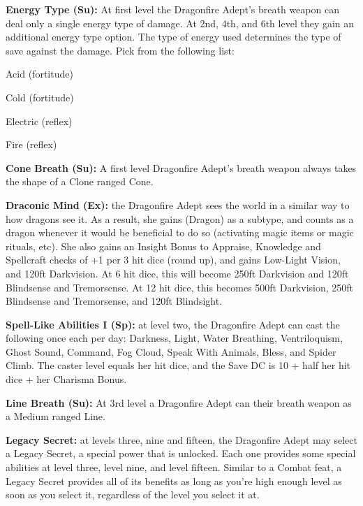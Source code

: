 \textbf{Energy Type (Su):} At first level the Dragonfire Adept's breath weapon can deal only a single energy type of damage. At 2nd, 4th, and 6th level they gain an additional energy type option. The type of energy used determines the type of save against the damage. Pick from the following list:
\begin{itemize*}
\item Acid (fortitude)
\item Cold (fortitude)
\item Electric (reflex)
\item Fire (reflex)
\end{itemize*}

\textbf{Cone Breath (Su):} A first level Dragonfire Adept's breath weapon always takes the shape of a Clone ranged Cone.

\textbf{Draconic Mind (Ex):} the Dragonfire Adept sees the world in a similar way to how dragons see it. As a result, she gains (Dragon) as a subtype, and counts as a dragon whenever it would be beneficial to do so (activating magic items or magic rituals, etc). She also gains an Insight Bonus to Appraise, Knowledge and Spellcraft checks of +1 per 3 hit dice (round up), and gains Low-Light Vision, and 120ft Darkvision. At 6 hit dice, this will become 250ft Darkvision and 120ft Blindsense and Tremorsense. At 12 hit dice, this becomes 500ft Darkvision, 250ft Blindsense and Tremorsense, and 120ft Blindsight.

\textbf{Spell-Like Abilities I (Sp):} at level two, the Dragonfire Adept can cast the following once each per day: Darkness, Light, Water Breathing, Ventriloquism, Ghost Sound, Command, Fog Cloud, Speak With Animals, Bless, and Spider Climb. The caster level equals her hit dice, and the Save DC is 10 + half her hit dice + her Charisma Bonus.

\textbf{Line Breath (Su):} At 3rd level a Dragonfire Adept can their breath weapon as a Medium ranged Line.

\textbf{Legacy Secret:} at levels three, nine and fifteen, the Dragonfire Adept may select a Legacy Secret, a special power that is unlocked. Each one provides some special abilities at level three, level nine, and level fifteen. Similar to a Combat feat, a Legacy Secret provides all of its benefits as long as you're high enough level as soon as you select it, regardless of the level you select it at.

